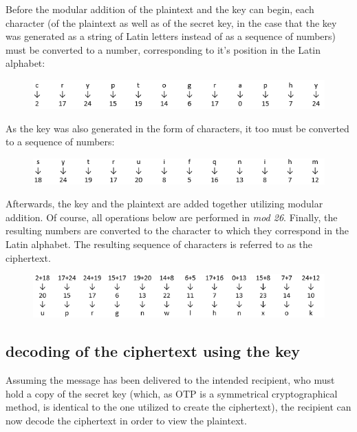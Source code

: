 \documentclass[12pt]{report}
\begin{document}
Before the modular addition of the plaintext and the key can begin, each character (of the plaintext as well as of the secret key, in the case that the key was generated as a string of Latin letters instead of as a sequence of numbers) must be converted to a number, corresponding to it's position in the Latin alphabet:

\begin{figure}[H]
\centering
\includegraphics[scale=1]{Table1.PNG}		
\end{figure}


As the key was also generated in the form of characters, it too must be converted to a sequence of numbers:

\begin{figure}[H]
\centering
\includegraphics[scale=1]{Table2.PNG}
\end{figure}

Afterwards, the key and the plaintext are added together utilizing modular addition. Of course, all operations below are performed in \textit{mod 26}. Finally, the resulting numbers are converted to the character to which they correspond in the Latin alphabet. The resulting sequence of characters is referred to as the ciphertext.

\begin{figure}[H]
\centering
\includegraphics[scale=1]{Table3.PNG}
\end{figure}

\subsection{decoding of the ciphertext using the key}
Assuming the message has been delivered to the intended recipient, who must hold a copy of the secret key (which, as OTP is a symmetrical cryptographical method, is identical to the one utilized to create the ciphertext), the recipient can now decode the ciphertext in order to view the plaintext.
\end{document}
